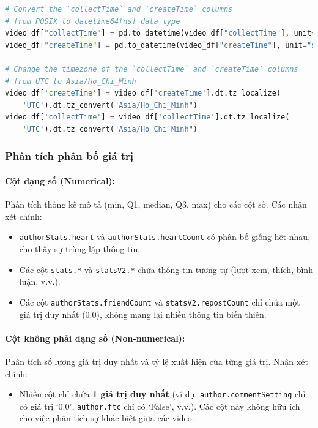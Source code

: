 \vietnameselst
\begin{lstlisting}[language=Python]
# Convert the `collectTime` and `createTime` columns
# from POSIX to datetime64[ns] data type
video_df["collectTime"] = pd.to_datetime(video_df["collectTime"], unit="s")
video_df["createTime"] = pd.to_datetime(video_df["createTime"], unit="s")

# Change the timezone of the `collectTime` and `createTime` columns
# from UTC to Asia/Ho_Chi_Minh
video_df['createTime'] = video_df['createTime'].dt.tz_localize(
    'UTC').dt.tz_convert("Asia/Ho_Chi_Minh")
video_df['collectTime'] = video_df['collectTime'].dt.tz_localize(
    'UTC').dt.tz_convert("Asia/Ho_Chi_Minh")
\end{lstlisting}

\subsubsection{Phân tích phân bố giá trị}

\paragraph{Cột dạng số (Numerical):}
Phân tích thống kê mô tả (min, Q1, median, Q3, max) cho các cột số. Các nhận xét chính:
\begin{itemize}
    \item \texttt{authorStats.heart} và \texttt{authorStats.heartCount} có phân bố giống hệt nhau, cho thấy sự trùng lặp thông tin.
    
    \item Các cột \texttt{stats.*} và \texttt{statsV2.*} chứa thông tin tương tự (lượt xem, thích, bình luận, v.v.).
    
    \item Các cột \texttt{authorStats.friendCount} và \texttt{statsV2.repostCount} chỉ chứa một giá trị duy nhất (0.0), không mang lại nhiều thông tin biến thiên.
\end{itemize}

\paragraph{Cột không phải dạng số (Non-numerical):}
Phân tích số lượng giá trị duy nhất và tỷ lệ xuất hiện của từng giá trị. Nhận xét chính:
\begin{itemize}
    \item Nhiều cột chỉ chứa \textbf{1 giá trị duy nhất} (ví dụ: \texttt{author.commentSetting} chỉ có giá trị `0.0', \texttt{author.ftc} chỉ có `False', v.v.). Các cột này không hữu ích cho việc phân tích sự khác biệt giữa các video.
\end{itemize}

